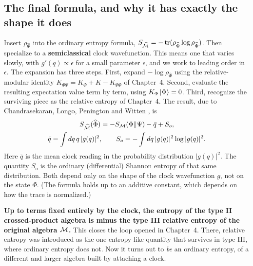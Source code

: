 \subsection*{The final formula, and why it has exactly the shape it does}

Insert $\rho_{\widehat\Phi}$ into the ordinary entropy formula, $S_{\widehat{\mathcal{M}}}=-\operatorname{tr}(\rho_{\widehat\Phi}\log
\rho_{\widehat\Phi})$. Then specialize to a \textbf{semiclassical} clock wavefunction. This means one that
varies slowly, with $g'(q)\propto\epsilon$ for a small parameter $\epsilon$, and we work to leading order in
$\epsilon$. The expansion has three steps. First, expand $-\log\rho_{\widehat\Phi}$ using the relative-modular
identity $K_{\Phi\Psi}=K_\Phi+K-K_{\Psi\Phi}$ of Chapter~4. Second, evaluate the resulting expectation value
term by term, using $K_\Phi\ket\Phi=0$. Third, recognize the surviving piece as the relative entropy of
Chapter~4. The result, due to Chandrasekaran, Longo, Penington and Witten \cite{CLPW}, is
\begin{equation}
\begin{gathered}
S_{\widehat{\mathcal{M}}}(\widehat\Phi) = -S_{\mathcal{M}}(\Phi\|\Psi) - \bar q + S_o, \\
\bar q = \int dq\,q\,|g(q)|^2, \qquad S_o = -\int dq\,|g(q)|^2\log|g(q)|^2 .
\end{gathered}
\label{eq:cp-entropy}
\end{equation}
Here $\bar q$ is the mean clock reading in the probability distribution $|g(q)|^2$. The quantity $S_o$ is the
ordinary (differential) Shannon entropy of that same distribution. Both depend only on the shape of the clock
wavefunction $g$, not on the state $\Phi$. (The formula holds up to an additive constant, which depends on how
the trace is normalized.)

\textbf{Up to terms fixed entirely by the clock, the entropy of the type II crossed-product algebra is minus
the type III relative entropy of the original algebra $\mathcal{M}$.} This closes the loop opened in Chapter~4. There,
relative entropy was introduced as the one entropy-like quantity that survives in type III, where ordinary
entropy does not. Now it turns out to \emph{be} an ordinary entropy, of a different and larger algebra built by
attaching a clock.

